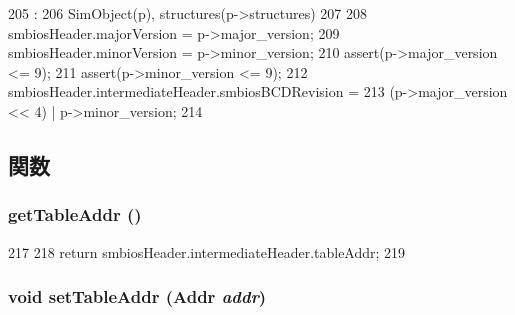 \begin{DoxyCode}
205                                                :
206     SimObject(p), structures(p->structures)
207 {
208     smbiosHeader.majorVersion = p->major_version;
209     smbiosHeader.minorVersion = p->minor_version;
210     assert(p->major_version <= 9);
211     assert(p->minor_version <= 9);
212     smbiosHeader.intermediateHeader.smbiosBCDRevision =
213         (p->major_version << 4) | p->minor_version;
214 }

\end{DoxyCode}


\subsection{関数}
\hypertarget{classX86ISA_1_1SMBios_1_1SMBiosTable_ad2b5276c95bbec6102bd1b9f1eb8ea26}{
\subsubsection[{getTableAddr}]{ getTableAddr ()}}
\label{classX86ISA_1_1SMBios_1_1SMBiosTable_ad2b5276c95bbec6102bd1b9f1eb8ea26}



\begin{DoxyCode}
217     {
218         return smbiosHeader.intermediateHeader.tableAddr;
219     }
\end{DoxyCode}
\hypertarget{classX86ISA_1_1SMBios_1_1SMBiosTable_aeaa306e0b92006f1478facf62f5d93d9}{
\subsubsection[{setTableAddr}]{\setlength{\rightskip}{0pt plus 5cm}void setTableAddr ({\bf Addr} {\em addr})}}
\label{classX86ISA_1_1SMBios_1_1SMBiosTable_aeaa306e0b92006f1478facf62f5d93d9}



